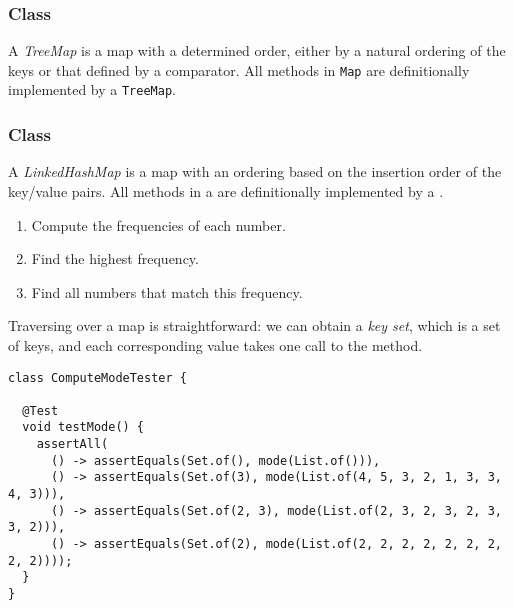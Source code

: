 \subsubsection{ Class}
A \emph{TreeMap} is a map with a determined order, either by a natural ordering of the keys or that defined by a comparator. All methods in \texttt{Map} are definitionally implemented by a \texttt{TreeMap}.

\subsubsection{ Class}
A \emph{LinkedHashMap} is a map with an ordering based on the insertion order of the key/value pairs. All methods in a  are definitionally implemented by a .


\begin{enumerate}
  \item Compute the frequencies of each number.
  \item Find the highest frequency.
  \item Find all numbers that match this frequency.
\end{enumerate}

Traversing over a map is straightforward: we can obtain a \emph{key set}, which is a set of keys, and each corresponding value takes one call to the  method.

\begin{cl}[]{}
\begin{lstlisting}[language=MyJava]
class ComputeModeTester {

  @Test
  void testMode() {
    assertAll(
      () -> assertEquals(Set.of(), mode(List.of())),  
      () -> assertEquals(Set.of(3), mode(List.of(4, 5, 3, 2, 1, 3, 3, 4, 3))),
      () -> assertEquals(Set.of(2, 3), mode(List.of(2, 3, 2, 3, 2, 3, 3, 2))),
      () -> assertEquals(Set.of(2), mode(List.of(2, 2, 2, 2, 2, 2, 2, 2, 2))));
  }
}
\end{lstlisting}
\end{cl}

